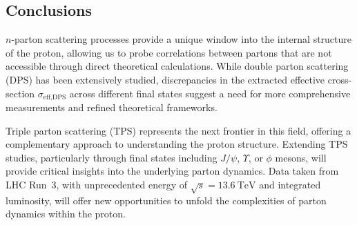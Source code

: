 \begin{survey}
\section{Conclusions}

$n$-parton scattering processes provide a unique window into the internal structure of the proton, allowing us to probe correlations between partons that are not accessible through direct theoretical calculations. While double parton scattering (DPS) has been extensively studied, discrepancies in the extracted effective cross-section $\sigma_{\text{eff,DPS}}$ across different final states suggest a need for more comprehensive measurements and refined theoretical frameworks.

Triple parton scattering (TPS) represents the next frontier in this field, offering a complementary approach to understanding the proton structure. Extending TPS studies, particularly through final states including $J/\psi$, $\Upsilon$, or $\phi$ mesons, will provide critical insights into the underlying parton dynamics. Data taken from LHC Run~3, with unprecedented energy of $\sqrt{s} = \SI{13.6}{\tera\eV}$ and integrated luminosity, will offer new opportunities to unfold the complexities of parton dynamics within the proton.




\end{survey}
